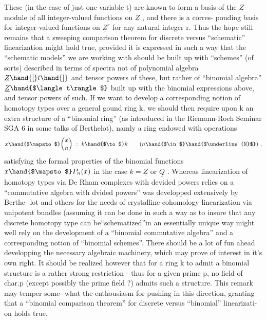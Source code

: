 These (in the case of just one variable t) are known to form a basis of
the $\underline{Z}$-module of all integer-valued functions on $\underline{Z}$ ,  and there is a corres-%
ponding basis for integer-valued functions on $\underline{Z}^r$\hand{,} for any natural integer
r.  Thus the hope still remains that a sweeping comparison theorem for
discrete versus ``schematic''  linearization might hold true,
provided it is expressed in such a way that the ``schematic models'' we are
working with should be built up with ``schemes'' (of sorts) described in
terms of spectra not of polynomial algebra  $\underline{Z}\hand{[}t\hand{]}$ and tensor powers of
these,  but rather of  ``binomial algebra''  $\underline{Z}\hand{$\langle t\rangle$}$ built up with the binomial
expressions above,  and tensor powers  of such.  If we want to develop a
corresponding notion of homotopy types over a general gound ring k,  we
should then require upon k an extra structure of a ``binomial ring'' (as
introduced in the Riemann-Roch Seminar SGA 6 in some talks of Berthelot),
namly a ring endowed with operations
\[ x \hand{$\mapsto$} \binom{x}{n} \ : \ k \hand{$\to$} k \qquad (n \hand{$\in$} \hand{$\underline{N}$}) \ , \]
satisfying the formal properties of the binomial functions  $x \hand{$\mapsto$} P_n(x)$
in the case $k=\underline{Z}$ or $\underline{Q}$ .  Whereas linearization of homotopy types via De
Rham complexes with devided powers relies on a ``commutative algebra with
dvided powers''   was developped extensively by Berthe-%
lot and others for the needs of crystalline cohomology\hand{)}\hand{,}  linearization via
unipotent bundles (assuming it can be done in such a way as to insure that
any discrete homotopy type can be``schematized''in an essentially unique way\hand{)}
might well rely on the development of a ``binomial commutative algebra''
and a corresponding notion of ``binomial schemes''.  There should be a lot
of fun ahead developping the necessary algebraic machinery,  which may
prove of interest in it's own right.  It should be realized however that 
for a ring k to admit a binomial structure is a rather strong restriction
  -  thus for a given prime p,  no field of char.p (except possibly
the prime field ?) admits such a structure.  This remark may temper some-%
what the enthousiasm for pushing in this direction,  granting that a
``binomial comparison theorem'' for discrete versus ``binomial'' linearizati-%
on holds true.


